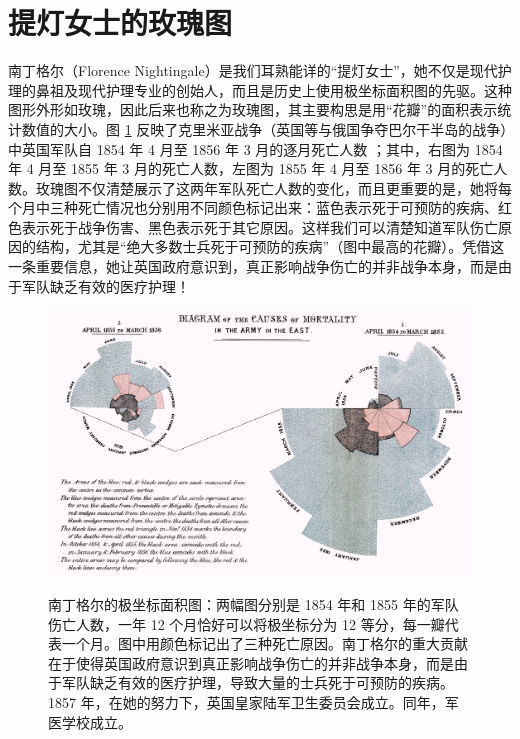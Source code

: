 \documentclass[
  b5paper,
  UTF8,twoside]{book}
\begin{document}
\hypertarget{sec:nightingale}{%
\section{提灯女士的玫瑰图}\label{sec:nightingale}}

南丁格尔（Florence Nightingale）是我们耳熟能详的``提灯女士''，她不仅是现代护理的鼻祖及现代护理专业的创始人，而且是历史上使用极坐标面积图的先驱。这种图形外形如玫瑰，因此后来也称之为玫瑰图，其主要构思是用``花瓣''的面积表示统计数值的大小。图 \ref{fig:nightingale-mortality} 反映了克里米亚战争（英国等与俄国争夺巴尔干半岛的战争）中英国军队自 1854 年 4 月至 1856 年 3 月的逐月死亡人数 \citep{Nightingale58}；其中，右图为 1854 年 4 月至 1855 年 3 月的死亡人数，左图为 1855 年 4 月至 1856 年 3 月的死亡人数。玫瑰图不仅清楚展示了这两年军队死亡人数的变化，而且更重要的是，她将每个月中三种死亡情况也分别用不同颜色标记出来：蓝色表示死于可预防的疾病、红色表示死于战争伤害、黑色表示死于其它原因。这样我们可以清楚知道军队伤亡原因的结构，尤其是``绝大多数士兵死于可预防的疾病''（图中最高的花瓣）。凭借这一条重要信息，她让英国政府意识到，真正影响战争伤亡的并非战争本身，而是由于军队缺乏有效的医疗护理！

\begin{figure}

{\centering \href{<https://en.wikipedia.org/wiki/Florence_Nightingale>}{\includegraphics{images/Nightingale-mortality} }

}

\caption[Florence Nightingale 的极坐标面积图]{南丁格尔的极坐标面积图：两幅图分别是 1854 年和 1855 年的军队伤亡人数，一年 12 个月恰好可以将极坐标分为 12 等分，每一瓣代表一个月。图中用颜色标记出了三种死亡原因。南丁格尔的重大贡献在于使得英国政府意识到真正影响战争伤亡的并非战争本身，而是由于军队缺乏有效的医疗护理，导致大量的士兵死于可预防的疾病。1857 年，在她的努力下，英国皇家陆军卫生委员会成立。同年，军医学校成立。}\label{fig:nightingale-mortality}
\end{figure}
\end{document}
